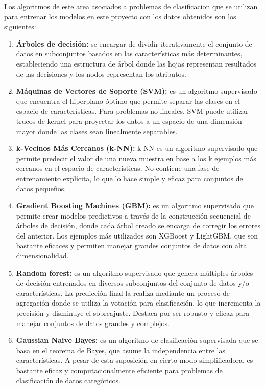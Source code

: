 Los algoritmos de este area asociados a problemas de clasificacion que se utilizan para entrenar los modelos en este proyecto con los datos obtenidos son los siguientes:
\begin{enumerate}
    \item \textbf{Árboles de decisión:} se encargar de dividir iterativamente el conjunto de datos en subconjuntos basados en las características más determinantes, estableciendo una estructura de árbol donde las hojas representan resultados de las decisiones y los nodos representan los atributos.
    \item \textbf{Máquinas de Vectores de Soporte (SVM):} es un algoritmo supervisado que encuentra el hiperplano óptimo que permite separar las clases en el espacio de características. Para problemas no lineales, SVM puede utilizar trucos de kernel para proyectar los datos a un espacio de una dimensión mayor donde las clases sean linealmente separables.
    \item \textbf{k-Vecinos Más Cercanos (k-NN):} k-NN es un algoritmo supervisado que permite predecir el valor de una nueva muestra en base a los k ejemplos más cercanos en el espacio de características. No contiene una fase de entrenamiento explícita, lo que lo hace simple y eficaz para conjuntos de datos pequeños.
    \item \textbf{Gradient Boosting Machines (GBM):} es un algoritmo supervisado que permite crear modelos predictivos a través de la construcción secuencial de árboles de decisión, donde cada árbol creado se encarga de corregir los errores del anterior. Los ejemplos más utilizados son XGBoost y LightGBM, que son bastante eficaces y permiten manejar grandes conjuntos de datos con alta dimensionalidad.
    \item \textbf{Random forest:} es un algoritmo supervisado que genera múltiples árboles de decisión entrenados en diversos subconjuntos del conjunto de datos y/o características. La predicción final la realiza mediante un proceso de agregación donde se utiliza la votación para clasificación, lo que incrementa la precisión y disminuye el sobreajuste. Destaca por ser robusto y eficaz para manejar conjuntos de datos grandes y complejos.
    \item \textbf{Gaussian Naive Bayes:} es un algoritmo de clasificación supervisada que se basa en el teorema de Bayes, que asume la independencia entre las características. A pesar de esta suposición en cierto modo simplificadora, es bastante eficaz y computacionalmente eficiente para problemas de clasificación de datos categóricos. 
\end{enumerate}


